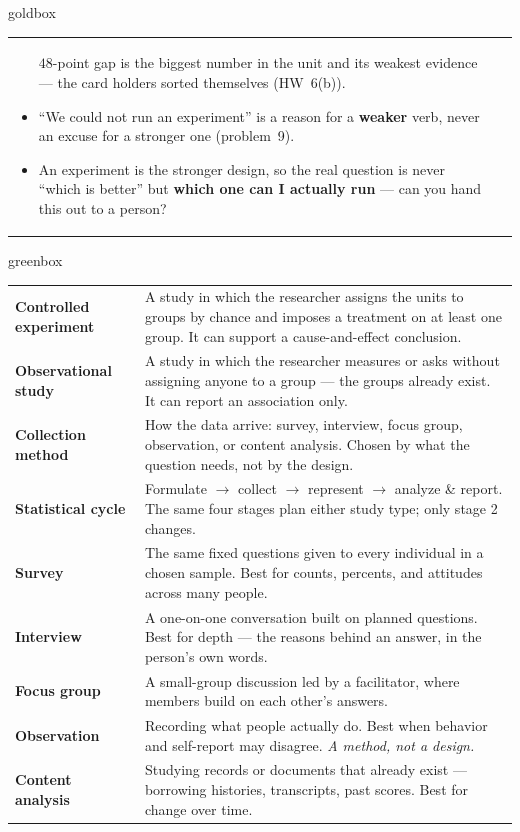 \documentclass[10pt]{article}
\begin{document}
\begin{skillbox}{goldbox}
\begin{tabularx}{\linewidth}{@{}X|X@{}}
\begin{itemize}[leftmargin=1.1em, nosep, after=\vspace{2pt}]
        $48$-point gap is the biggest number in the unit and its weakest evidence --- the card
        holders sorted themselves (HW~6(b)).
  \item ``We could not run an experiment'' is a reason for a \textbf{weaker} verb, never an
        excuse for a stronger one (problem~9).
  \item An experiment is the stronger design, so the real question is never ``which is better''
        but \textbf{which one can I actually run} --- can you hand this out to a person?
\end{itemize}
\end{tabularx}
\end{skillbox}

\boxguard[24]
\begin{skillbox}{greenbox}
\small
\renewcommand{\arraystretch}{1.35}
\begin{tabularx}{\linewidth}{@{} >{\bfseries}p{3.1cm} X @{}}
Controlled experiment & A study in which the researcher assigns the units to groups by chance
       and imposes a treatment on at least one group. It can support a cause-and-effect
       conclusion. \\
Observational study & A study in which the researcher measures or asks without assigning anyone
       to a group --- the groups already exist. It can report an association only. \\
Collection method & How the data arrive: survey, interview, focus group, observation, or
       content analysis. Chosen by what the question needs, not by the design. \\
Statistical cycle & Formulate $\rightarrow$ collect $\rightarrow$ represent $\rightarrow$
       analyze \& report. The same four stages plan either study type; only stage 2 changes. \\
Survey & The same fixed questions given to every individual in a chosen sample. Best for counts,
       percents, and attitudes across many people. \\
Interview & A one-on-one conversation built on planned questions. Best for depth --- the reasons
       behind an answer, in the person's own words. \\
Focus group & A small-group discussion led by a facilitator, where members build on each other's
       answers. \\
Observation & Recording what people actually do. Best when behavior and self-report may
       disagree. \emph{A method, not a design.} \\
Content analysis & Studying records or documents that already exist --- borrowing histories,
       transcripts, past scores. Best for change over time. \\
\end{tabularx}
\end{skillbox}
\end{document}
